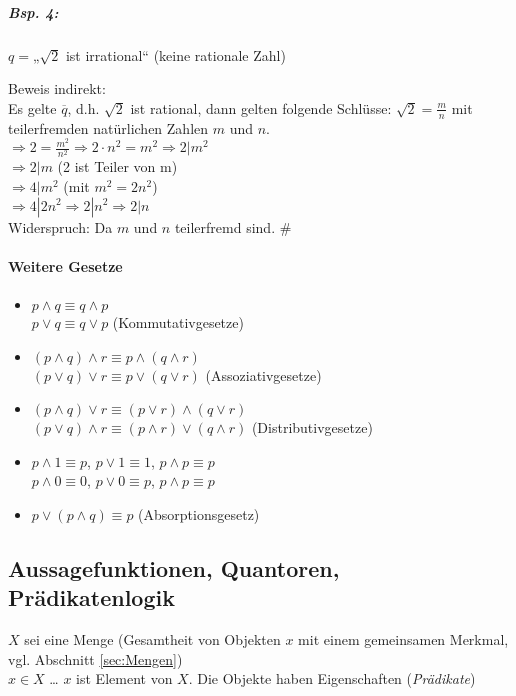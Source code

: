 \subparagraph{Bsp. 4:}\parskp
$q = $„$\sqrt{2}$ ist irrational“ (keine rationale Zahl)

Beweis indirekt: \\
Es gelte $\overline{q}$, d.h. $\sqrt{2}$ ist rational, dann gelten folgende Schlüsse: $\sqrt{2} = \frac{m}{n}$ mit teilerfremden natürlichen Zahlen $m$ und $n$.\\
$\Rightarrow 2=\frac{m^2}{n^2} \Rightarrow 2 \cdot n^2 = m^2 \Rightarrow 2|m^2$\\
$\Rightarrow \boxed{2|m}$ (2 ist Teiler von m)\\
$\Rightarrow 4|m^2$ (mit $m^2=2n^2$)\\
$\Rightarrow 4|2n^2 \Rightarrow 2|n^2 \Rightarrow \boxed{2|n}$\\
Widerspruch: Da $m$ und $n$ teilerfremd sind.	\#

\paragraph{Weitere Gesetze}

\begin{itemize}
\item $p\wedge q \equiv q \wedge p$\\$p\vee q \equiv q \vee p$ \tab \tab \tab(Kommutativgesetze)
\item $(p\wedge q)\wedge r \equiv p\wedge (q\wedge r)$\\$(p\vee q)\vee r \equiv p\vee (q \vee r)$ \tab \tab(Assoziativgesetze)
\item $(p\wedge q)\vee r \equiv (p \vee r) \wedge (q \vee r)$\\$(p\vee q)\wedge r \equiv (p\wedge r) \vee (q \wedge r)$ \tab(Distributivgesetze)
\item $p\wedge 1 \equiv p$, $p\vee 1 \equiv 1$, $p\wedge p \equiv p$\\$p\wedge 0 \equiv 0$, $p\vee 0 \equiv p$, $p\wedge p \equiv p$
\item $p \vee (p\wedge q ) \equiv p$ \tab \tab(Absorptionsgesetz)
\end{itemize}

\subsection{Aussagefunktionen, Quantoren, Prädikatenlogik} \label{subsec:Aussagefunktionen}
$X$ sei eine Menge (Gesamtheit von Objekten $x$ mit einem gemeinsamen Merkmal, vgl.  Abschnitt \ref{sec:Mengen})\\
$x\in X$ … $x$ ist Element von $X$. Die Objekte haben Eigenschaften (\emph{Prädikate})

